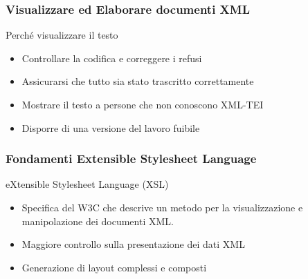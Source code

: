 \begin{frame}
    \frametitle{Visualizzare ed Elaborare documenti XML}
    \addtocounter{nframe}{1}
    

     \begin{block}{Perché visualizzare il testo}
         \begin{itemize}
            \item  Controllare la codifica e correggere i refusi
             \item Assicurarsi che tutto sia stato trascritto correttamente
             \item Mostrare il testo a persone che non conoscono XML-TEI
             \item Disporre di una versione del lavoro fuibile
        \end{itemize}
     \end{block}
    
\end{frame}



\begin{frame}
    \frametitle{Fondamenti Extensible Stylesheet Language}
    \addtocounter{nframe}{1}
    

     \begin{block}{eXtensible Stylesheet Language (XSL)}
         \begin{itemize}
            \item  Specifica del W3C che descrive un metodo per la visualizzazione e manipolazione dei documenti XML.
             \item Maggiore controllo sulla presentazione dei dati XML
             \item Generazione di layout complessi e composti
        \end{itemize}
     \end{block}
    
\end{frame}


